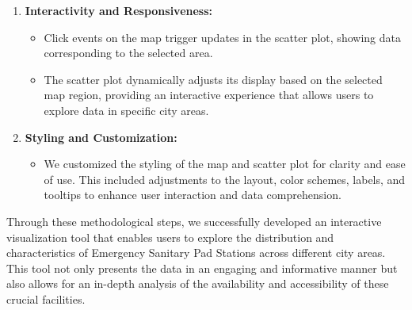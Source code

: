 \begin{enumerate}
    \item \textbf{Interactivity and Responsiveness:}
          \begin{itemize}
              \item Click events on the map trigger updates in the scatter plot, showing data corresponding to the selected area.
              \item The scatter plot dynamically adjusts its display based on the selected map region, providing an interactive experience that allows users to explore data in specific city areas.
          \end{itemize}

    \item \textbf{Styling and Customization:}
          \begin{itemize}
              \item We customized the styling of the map and scatter plot for clarity and ease of use. This included adjustments to the layout, color schemes, labels, and tooltips to enhance user interaction and data comprehension.
          \end{itemize}
\end{enumerate}

Through these methodological steps, we successfully developed an interactive visualization tool that enables users to explore the distribution and characteristics of Emergency Sanitary Pad Stations across different city areas. This tool not only presents the data in an engaging and informative manner but also allows for an in-depth analysis of the availability and accessibility of these crucial facilities.

